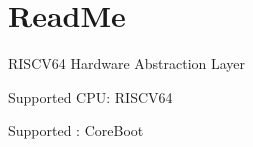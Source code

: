 \chapter{Read\+Me}
\hypertarget{md_dev_2_kernel_2_h_a_l_kit_2_r_i_s_c_v_2_read_me}{}\label{md_dev_2_kernel_2_h_a_l_kit_2_r_i_s_c_v_2_read_me}
RISCV64 Hardware Abstraction Layer


\begin{DoxyItemize}
\item Supported CPU\+: RISCV64
\item Supported \+: Core\+Boot 
\end{DoxyItemize}